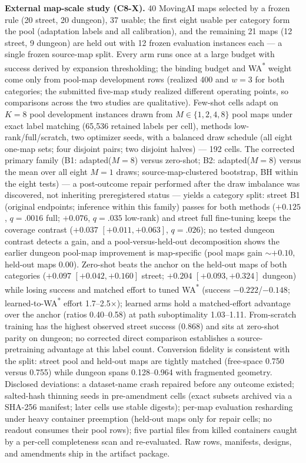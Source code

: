 \documentclass[letterpaper]{article} %
\begin{document}
\clearpage
\textbf{External map-scale study (C8-X).} 40 MovingAI maps selected by a
frozen rule (20 street, 20 dungeon), 37 usable; the first eight usable
per category form the pool (adaptation labels and all calibration), and
the remaining 21 maps (12 street, 9 dungeon) are held out with 12 frozen
evaluation instances each --- a single frozen source-map split. Every arm
runs once at a large budget with success derived by expansion
thresholding; the binding budget and WA\textsuperscript{*} weight come
only from pool-map development rows (realized 400 and $w{=}3$ for both
categories; the submitted five-map study realized different operating
points, so comparisons across the two studies are qualitative). Few-shot
cells adapt on $K{=}8$ pool development instances drawn from $M \in \{1,
2, 4, 8\}$ pool maps under exact label matching (65{,}536 retained labels
per cell), methods low-rank/full/scratch, two optimizer seeds, with a
balanced draw schedule (all eight one-map sets; four disjoint pairs; two
disjoint halves) --- 192 cells. The corrected primary family (B1:
adapted($M{=}8$) versus zero-shot; B2: adapted($M{=}8$) versus the mean
over all eight $M{=}1$ draws; source-map-clustered bootstrap, BH within
the eight tests) --- a post-outcome repair performed after the draw imbalance was discovered, not inheriting preregistered status --- yields a category split: street B1 (original endpoints; inference within this family) passes for both
methods ($+0.125$, $q{=}.0016$ full; $+0.076$, $q{=}.035$ low-rank) and
street full fine-tuning keeps the coverage contrast ($+0.037$
$[+0.011,+0.063]$, $q{=}.026$); no tested dungeon contrast detects a gain, and a
pool-versus-held-out decomposition shows the earlier dungeon
pool-map improvement is map-specific (pool maps gain ${\sim}+0.10$, held-out maps
$0.00$). Zero-shot beats the anchor on the held-out maps of both
categories ($+0.097$ $[+0.042,+0.160]$ street; $+0.204$ $[+0.093,+0.324]$
dungeon) while losing success and matched effort to tuned
WA\textsuperscript{*} (success $-0.222$/$-0.148$; learned-to-WA\textsuperscript{*}
effort 1.7--2.5$\times$); learned arms hold a matched-effort advantage
over the anchor (ratios 0.40--0.58) at path suboptimality 1.03--1.11.
From-scratch training has the highest observed street success (0.868)
and sits at zero-shot parity on dungeon; no corrected direct comparison
establishes a source-pretraining advantage at this label count. Conversion fidelity is consistent with the
split: street pool and held-out maps are tightly matched (free-space
0.750 versus 0.755) while dungeon spans 0.128--0.964 with fragmented
geometry. Disclosed deviations: a dataset-name crash repaired before any
outcome existed; salted-hash thinning seeds in pre-amendment cells
(exact subsets archived via a SHA-256 manifest; later cells use stable
digests); per-map evaluation resharding under heavy container preemption
(held-out maps only for repair cells; no readout consumes their pool
rows); five partial files from killed containers caught by a per-cell
completeness scan and re-evaluated. Raw rows, manifests, designs, and
amendments ship in the artifact package.


\end{document}
